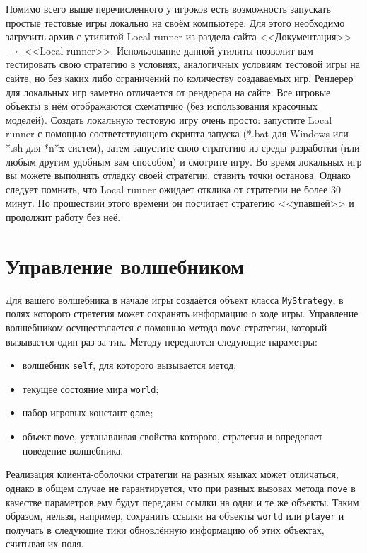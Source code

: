 Помимо всего выше перечисленного у игроков есть возможность запускать простые тестовые игры локально на своём компьютере. Для этого
необходимо загрузить архив с утилитой Local runner из раздела сайта <<Документация>> $\rightarrow$ <<Local runner>>. Использование данной
утилиты позволит вам тестировать свою стратегию в условиях, аналогичных условиям тестовой игры на сайте, но без каких либо ограничений по
количеству создаваемых игр. Рендерер для локальных игр заметно отличается от рендерера на сайте. Все игровые объекты в нём отображаются
схематично (без использования красочных моделей). Создать локальную тестовую игру очень просто: запустите Local runner с помощью
соответствующего скрипта запуска (*.bat для Windows или *.sh для *n*x систем), затем запустите свою стратегию из среды разработки (или любым
другим удобным вам способом) и смотрите игру. Во время локальных игр вы можете выполнять отладку своей стратегии, ставить точки останова.
Однако следует помнить, что Local runner ожидает отклика от стратегии не более $30$ минут. По прошествии этого времени он посчитает
стратегию <<упавшей>> и продолжит работу без неё.

\section{Управление волшебником}

Для вашего волшебника в начале игры создаётся объект класса \texttt{MyStrategy}, в полях которого стратегия может сохранять информацию о
ходе игры. Управление волшебником осуществляется с помощью метода \texttt{move} стратегии, который вызывается один раз за тик. Методу
передаются следующие параметры:
\begin{itemize}
  \item волшебник \texttt{self}, для которого вызывается метод;
  \item текущее состояние мира \texttt{world};
  \item набор игровых констант \texttt{game};
  \item объект \texttt{move}, устанавливая свойства которого, стратегия и определяет поведение волшебника.
\end{itemize}

Реализация клиента-оболочки стратегии на разных языках может отличаться, однако в общем случае \textbf{не} гарантируется, что при разных
вызовах метода \texttt{move} в качестве параметров ему будут переданы ссылки на одни и те же объекты. Таким образом, нельзя, например,
сохранить ссылки на объекты \texttt{world} или \texttt{player} и получать в следующие тики обновлённую информацию об этих объектах, считывая
их поля.

